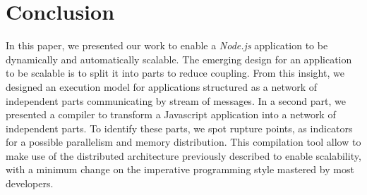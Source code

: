 \section{Conclusion} \label{section:conclusion}

In this paper, we presented our work to enable a \textit{Node.js} application to be dynamically and automatically scalable.
The emerging design for an application to be scalable is to split it into parts to reduce coupling.
From this insight, we designed an execution model for applications structured as a network of independent parts communicating by stream of messages.
In a second part, we presented a compiler to transform a Javascript application into a network of independent parts.
To identify these parts, we spot rupture points, as indicators for a possible parallelism and memory distribution.
This compilation tool allow to make use of the distributed architecture previously described to enable scalability, with a minimum change on the imperative programming style mastered by most developers.